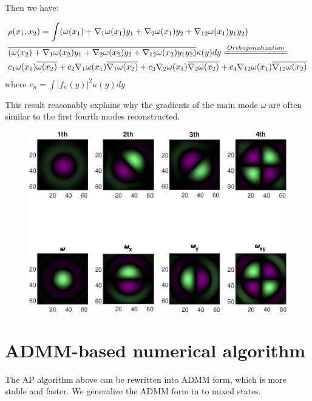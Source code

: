 \documentclass{article}
\numberwithin{equation}{section}
\begin{document}
Then we have:
 
 
  
 $$
 \begin{aligned}
 &\rho(x_1,x_2) = 
 \int (\omega(x_1) + \nabla_1 \omega(x_1)y_1 + \nabla_2 \omega(x_1)y_2 + \nabla_{12}\omega(x_1) y_1 y_2)\\ &\overline{(\omega(x_2) + \nabla_1 \omega(x_2)y_1 + \nabla_2 \omega(x_2)y_2 + \nabla_{12}\omega(x_2) y_1 y_2)}
 \kappa(y)dy \xlongequal{Orthogonalization}\\
 &
 c_1 \omega(x_1)\overline{\omega(x_2)} +
 c_2 \nabla_{1}\omega(x_1)\overline{\nabla_{1}\omega(x_2)} +
 c_3 \nabla_{2}\omega(x_1)\overline{\nabla_{2}\omega(x_2)}+ 
 c_4 \nabla_{12}\omega(x_1)\overline{\nabla_{12}\omega(x_2)} 
  \end{aligned}
 $$
where $c_n = \int |f_n(y)|^2 \kappa(y) dy$

This result reasonably explains why the gradients of the main mode $\omega$ are often similar to the first fourth modes reconstructed. 

\begin{figure}[H]
\centering

\includegraphics[width=0.9\linewidth]{../figures/gradients.eps}  
 \end{figure}



\section{ADMM-based numerical algorithm}

The AP algorithm above can be rewritten into ADMM form, which is more stable and faster. We generalize the ADMM form in \cite{admm} to mixed states.
\end{document}
